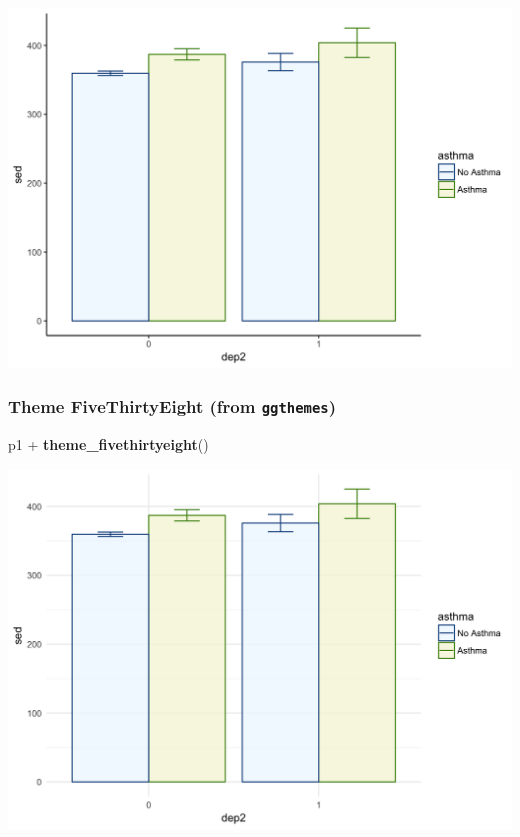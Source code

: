 \documentclass[]{tufte-book}
\newenvironment{Shaded}{}{}
\newcommand{\KeywordTok}[1]{\textcolor[rgb]{0.00,0.44,0.13}{\textbf{#1}}}
\newcommand{\StringTok}[1]{\textcolor[rgb]{0.25,0.44,0.63}{#1}}
\newcommand{\OperatorTok}[1]{\textcolor[rgb]{0.40,0.40,0.40}{#1}}
\newcommand{\NormalTok}[1]{#1}
\theoremstyle{definition}
\theoremstyle{definition}
\theoremstyle{remark}
\begin{document}
\includegraphics{_main_files/figure-latex/unnamed-chunk-148-1}

\subsubsection*{\texorpdfstring{Theme FiveThirtyEight (from
\texttt{ggthemes})}{Theme FiveThirtyEight (from ggthemes)}}\label{theme-fivethirtyeight-from-ggthemes}

\begin{Shaded}
\begin{Highlighting}[]
\NormalTok{p1 }\OperatorTok{+}\StringTok{ }\KeywordTok{theme_fivethirtyeight}\NormalTok{()}
\end{Highlighting}
\end{Shaded}

\includegraphics{_main_files/figure-latex/unnamed-chunk-149-1}
\end{document}
